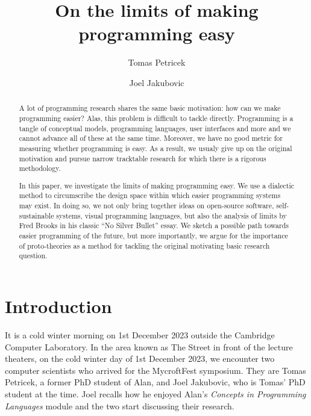 \documentclass[runningheads]{llncs}
\begin{document}
\title{On the limits of making programming easy}

\author{Tomas Petricek \and
Joel Jakubovic}


\maketitle

\begin{abstract}
A lot of programming research shares the same basic motivation: how can we make programming easier? Alas, this problem is difficult to tackle directly. Programming is a tangle of conceptual models, programming languages, user interfaces and more and we cannot advance all of these at the same time. Moreover, we have no good metric for measuring whether programming is easy. As a result, we usualy give up on the original motivation and pursue narrow tracktable research for which there is a rigorous methodology.

\qquad In this paper, we investigate the limits of making programming easy. We use a dialectic method to circumscribe the design space within which easier programming systems may exist. In doing so, we not only bring together ideas on open-source software, self-sustainable systems, visual programming languages, but also the analysis of limits by Fred Brooks in his classic ``No Silver Bullet'' essay. We sketch a possible path towards easier programming of the future, but more importantly, we argue for the importance of proto-theories as a method for tackling the original motivating basic research question.

\end{abstract}

\section{Introduction}
It is a cold winter morning on 1st December 2023 outside the Cambridge Computer Laboratory. In the area known as The Street in front of the lecture theaters, on the cold winter day of 1st December 2023, we encounter two computer scientists who arrived for the MycroftFest symposium. They are Tomas Petricek, a former PhD student of Alan, and Joel Jakubovic, who is Tomas' PhD student at the time. Joel recalls how he enjoyed Alan's \emph{Concepts in Programming Languages} module and the two start discussing their research.
\end{document}
